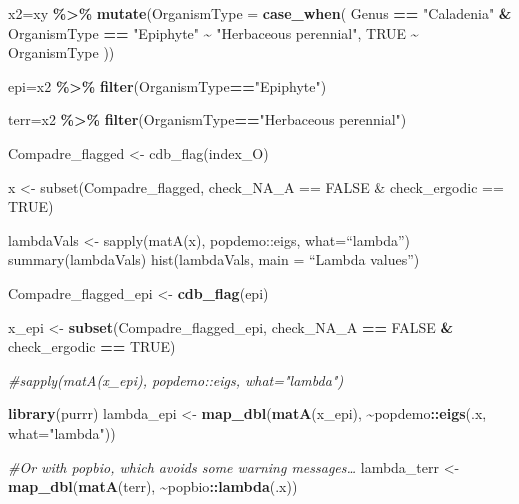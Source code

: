 \documentclass[
]{book}
\newenvironment{Shaded}{\begin{snugshade}}{\end{snugshade}}
\newcommand{\AttributeTok}[1]{\textcolor[rgb]{0.13,0.29,0.53}{#1}}
\newcommand{\CommentTok}[1]{\textcolor[rgb]{0.56,0.35,0.01}{\textit{#1}}}
\newcommand{\ConstantTok}[1]{\textcolor[rgb]{0.56,0.35,0.01}{#1}}
\newcommand{\FunctionTok}[1]{\textcolor[rgb]{0.13,0.29,0.53}{\textbf{#1}}}
\newcommand{\NormalTok}[1]{#1}
\newcommand{\OtherTok}[1]{\textcolor[rgb]{0.56,0.35,0.01}{#1}}
\newcommand{\SpecialCharTok}[1]{\textcolor[rgb]{0.81,0.36,0.00}{\textbf{#1}}}
\newcommand{\StringTok}[1]{\textcolor[rgb]{0.31,0.60,0.02}{#1}}
\theoremstyle{definition}
\theoremstyle{definition}
\theoremstyle{definition}
\theoremstyle{definition}
\theoremstyle{remark}
\begin{document}
\begin{Shaded}
\begin{Highlighting}[]
\NormalTok{x2}\OtherTok{=}\NormalTok{xy }\SpecialCharTok{\%\textgreater{}\%} 
  \FunctionTok{mutate}\NormalTok{(}\AttributeTok{OrganismType =} \FunctionTok{case\_when}\NormalTok{(}
\NormalTok{    Genus }\SpecialCharTok{==}  \StringTok{"Caladenia"} \SpecialCharTok{\&}\NormalTok{ OrganismType }\SpecialCharTok{==} \StringTok{"Epiphyte"} \SpecialCharTok{\textasciitilde{}} \StringTok{"Herbaceous perennial"}\NormalTok{,}
    \ConstantTok{TRUE} \SpecialCharTok{\textasciitilde{}}\NormalTok{ OrganismType}
\NormalTok{  ))}

\NormalTok{epi}\OtherTok{=}\NormalTok{x2 }\SpecialCharTok{\%\textgreater{}\%} 
  \FunctionTok{filter}\NormalTok{(OrganismType}\SpecialCharTok{==}\StringTok{"Epiphyte"}\NormalTok{)}

\NormalTok{terr}\OtherTok{=}\NormalTok{x2 }\SpecialCharTok{\%\textgreater{}\%} 
  \FunctionTok{filter}\NormalTok{(OrganismType}\SpecialCharTok{==}\StringTok{"Herbaceous perennial"}\NormalTok{)}
\end{Highlighting}
\end{Shaded}

Compadre\_flagged \textless- cdb\_flag(index\_O)

x \textless- subset(Compadre\_flagged, check\_NA\_A == FALSE \& check\_ergodic == TRUE)

lambdaVals \textless- sapply(matA(x), popdemo::eigs, what=``lambda'') summary(lambdaVals) hist(lambdaVals, main = ``Lambda values'')

\begin{Shaded}
\begin{Highlighting}[]
\NormalTok{Compadre\_flagged\_epi }\OtherTok{\textless{}{-}} \FunctionTok{cdb\_flag}\NormalTok{(epi)}

\NormalTok{x\_epi }\OtherTok{\textless{}{-}} \FunctionTok{subset}\NormalTok{(Compadre\_flagged\_epi, check\_NA\_A }\SpecialCharTok{==} \ConstantTok{FALSE} \SpecialCharTok{\&}\NormalTok{ check\_ergodic }\SpecialCharTok{==} \ConstantTok{TRUE}\NormalTok{)}

\CommentTok{\#sapply(matA(x\_epi), popdemo::eigs, what="lambda")}

\FunctionTok{library}\NormalTok{(purrr)}
\NormalTok{lambda\_epi }\OtherTok{\textless{}{-}} \FunctionTok{map\_dbl}\NormalTok{(}\FunctionTok{matA}\NormalTok{(x\_epi), }\SpecialCharTok{\textasciitilde{}}\NormalTok{popdemo}\SpecialCharTok{::}\FunctionTok{eigs}\NormalTok{(.x, }\AttributeTok{what=}\StringTok{"lambda"}\NormalTok{))}

\CommentTok{\#Or with popbio, which avoids some warning messages…}
\NormalTok{lambda\_terr }\OtherTok{\textless{}{-}} \FunctionTok{map\_dbl}\NormalTok{(}\FunctionTok{matA}\NormalTok{(terr), }\SpecialCharTok{\textasciitilde{}}\NormalTok{popbio}\SpecialCharTok{::}\FunctionTok{lambda}\NormalTok{(.x))}
\end{Highlighting}
\end{Shaded}
\end{document}
